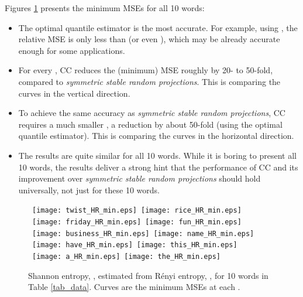 \documentclass{sig-alternate}
\begin{document}
\clearpage

Figures \ref{fig_HR_min} presents the minimum MSEs for all 10 words:
\begin{itemize}
\item The optimal quantile estimator is the most accurate. For example, using , the relative MSE is only less than  (or even ), which may be already accurate enough for some applications.
\item For every , CC reduces the (minimum) MSE roughly by 20- to 50-fold, compared to {\em symmetric stable random projections}. This is comparing the curves in the vertical direction.
\item To achieve the same accuracy as {\em symmetric stable random projections}, CC requires a much smaller , a reduction by about 50-fold (using the optimal quantile estimator). This is comparing the curves in the horizontal direction.
\item The results are quite similar for all 10 words. While it is boring to present all 10 words, the results deliver a strong hint that the performance of CC and its improvement over {\em symmetric stable random projections} should hold
    universally, not just for these 10 words.
\end{itemize}

\begin{figure}[h]
\begin{center}\mbox{
{\texttt{[image: twist\_HR\_min.eps]}} \hspace{-0.1in}
{\texttt{[image: rice\_HR\_min.eps]}}}
\mbox{
{\texttt{[image: friday\_HR\_min.eps]}} \hspace{-0.1in}
{\texttt{[image: fun\_HR\_min.eps]}}}
\mbox{
{\texttt{[image: business\_HR\_min.eps]}} \hspace{-0.1in}
{\texttt{[image: name\_HR\_min.eps]}}}
\mbox{
{\texttt{[image: have\_HR\_min.eps]}} \hspace{-0.1in}
{\texttt{[image: this\_HR\_min.eps]}}
}
\mbox{
{\texttt{[image: a\_HR\_min.eps]}} \hspace{-0.1in}
{\texttt{[image: the\_HR\_min.eps]}}
}
\end{center}
\vspace{-0.15in}
\caption{Shannon entropy, , estimated from R\'enyi  entropy, , for 10 words in Table \ref{tab_data}. Curves are the minimum MSEs at each .  }\label{fig_HR_min}
\end{figure}
\end{document}
